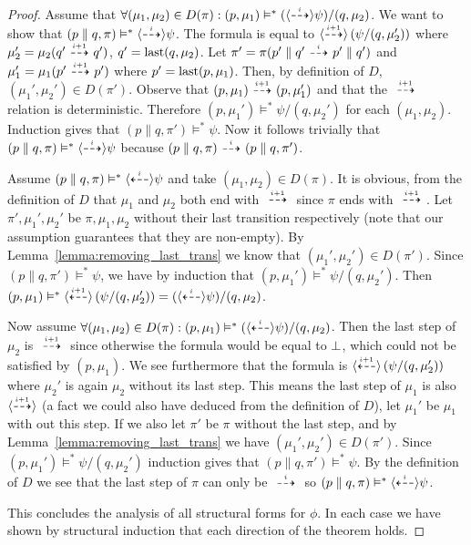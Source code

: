 \begin{proof}
    \rtl Assume that $\forall (\mu_1,\mu_2) \in D(\pi) : (p,\mu_1) \vDash^* (\mbox{\ensuremath{\langle\stackrel{_{i}}{\dashrightarrow}\rangle}}
    \psi)/(q,\mu_2)$. 
    We want to show that $(p\parallel q,\pi) \vDash^* \mbox{\ensuremath{\langle\stackrel{_{i}}{\dashrightarrow}\rangle}}\psi$.
    The formula is equal to $\mbox{\ensuremath{\langle\stackrel{_{i+1}}{\dashrightarrow}\rangle}} \left( \psi / (q,\mu_2') \right)$
    where $\mu_2' = \mu_2(q' \ {\stackrel{_{i+1}}{\dashrightarrow}}\  q')$, $q' = \operatorname{last}(q,\mu_2)$. Let $\pi' = \pi
    (p'\parallel q' \ {\stackrel{_{i}}{\dashrightarrow}}\  p'\parallel q')$ and $\mu_1' = \mu_1(p'\ {\stackrel{_{i+1}}{\dashrightarrow}}\  p')$
    where $p' = \operatorname{last}(p,\mu_1)$. Then, by definition of $D$, $(\mu_1',\mu_2') \in D(\pi')$.
    Observe that $(p,\mu_1)\ {\stackrel{_{i+1}}{\dashrightarrow}}\ (p,\mu_1')$ and that the $\ {\stackrel{_{i+1}}{\dashrightarrow}}\ $ relation
    is deterministic. Therefore
    $(p,\mu_1')\vDash^* \psi/(q,\mu_2')$ for each $(\mu_1,\mu_2)$. 
    Induction gives that $(p\parallel q, \pi')
    \vDash^* \psi$. Now it follows trivially that $(p\parallel q,\pi) \vDash^* \mbox{\ensuremath{\langle\stackrel{_{i}}{\dashrightarrow}\rangle}}
    \psi$ because $(p\parallel q, \pi)\ {\stackrel{_{i}}{\dashrightarrow}}\ (p\parallel q, \pi')$.



    \ltr Assume $(p\parallel q, \pi) \vDash^* \mbox{\ensuremath{\langle\stackrel{_{i}}{\dashleftarrow}\rangle}}\psi$ and take $(\mu_1,\mu_2)
    \in D(\pi)$. It is obvious, from the definition of $D$ that $\mu_1$ and $\mu_2$ both
    end with $\ {\stackrel{_{i+1}}{\dashrightarrow}}\ $ since $\pi$ ends with $\ {\stackrel{_{i+1}}{\dashrightarrow}}\ $. Let $\pi', \mu_1', \mu_2'$
    be $\pi,\mu_1,\mu_2$ without their last transition respectively (note that our assumption
    guarantees that they are non-empty). By Lemma~\ref{lemma:removing_last_trans} we know
    that $(\mu_1',\mu_2') \in D(\pi')$. Since $(p\parallel q,\pi') \vDash^* \psi$, we have
    by induction that $(p,\mu_1')\vDash^* \psi/(q,\mu_2')$. Then $(p,\mu_1)\vDash^*
    \mbox{\ensuremath{\langle\stackrel{_{i+1}}{\dashleftarrow}\rangle}} \left( \psi/(q,\mu_2') \right) = (\mbox{\ensuremath{\langle\stackrel{_{i}}{\dashleftarrow}\rangle}}\psi)/(q,\mu_2)$.

    \rtl Now assume $\forall (\mu_1,\mu_2) \in D(\pi) : (p,\mu_1) \vDash^* (\mbox{\ensuremath{\langle\stackrel{_{i}}{\dashleftarrow}\rangle}}
    \psi)/(q,\mu_2)$. Then the last step of $\mu_2$ is $\ {\stackrel{_{i+1}}{\dashrightarrow}}\ $ since otherwise
    the formula would be equal to $\bot$, which could not be satisfied by $(p,\mu_1)$.
    We see furthermore that the formula is $\mbox{\ensuremath{\langle\stackrel{_{i+1}}{\dashleftarrow}\rangle}}\left(\psi/(q,\mu_2')\right)$ where
    $\mu_2'$ is again $\mu_2$ without its last step. This means the last step of $\mu_1$
    is also $\mbox{\ensuremath{\langle\stackrel{_{i+1}}{\dashrightarrow}\rangle}}$ (a fact we could also have deduced from the definition of $D$),
    let $\mu_1'$ be $\mu_1$ with out this step. If we also let $\pi'$ be $\pi$ without the
    last step, and by Lemma~\ref{lemma:removing_last_trans} we have
    $(\mu_1',\mu_2')\in D(\pi')$. Since
    $(p,\mu_1')\vDash^* \psi/(q,\mu_2')$ induction gives that $(p\parallel q,\pi')\vDash^*
    \psi$. By the definition of $D$ we see that the last step of $\pi$ can only be $\ {\stackrel{_{i}}{\dashrightarrow}}\ $
    so $(p\parallel q, \pi)\vDash^* \mbox{\ensuremath{\langle\stackrel{_{i}}{\dashleftarrow}\rangle}} \psi$.

    \vspace{1em}

    This concludes the analysis of all structural forms for $\phi$. In each case we have
    shown by structural induction that each direction of the theorem holds.
\end{proof}
